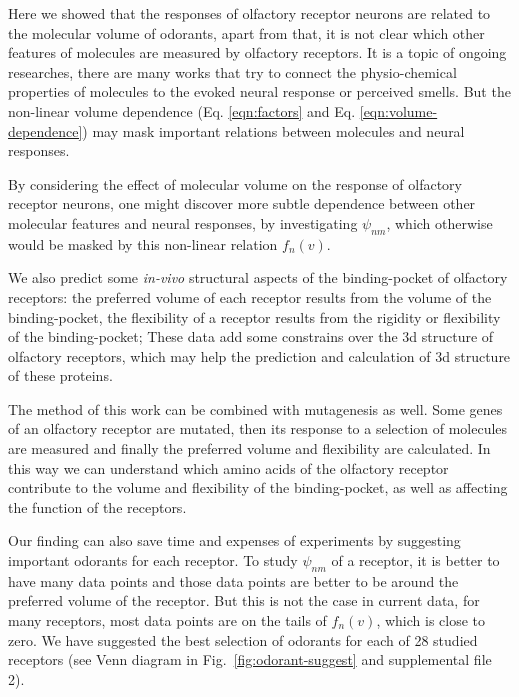 \documentclass[11pt]{paper} %
\newcommand{\numberofreceptors}{ 28 }
\begin{document}
Here we showed that the responses of olfactory receptor neurons are related to the molecular volume of odorants, 
apart from that, it is not clear which other features of molecules are measured by olfactory receptors. 
It is a topic of ongoing researches, 
there are many works that try to connect the physio-chemical properties of molecules to the evoked neural response or perceived smells.
But the non-linear volume dependence (Eq. \ref{eqn:factors} and Eq. \ref{eqn:volume-dependence})  
may mask important relations between molecules and neural responses.

By considering the effect of molecular volume on the response of olfactory receptor neurons, 
one might discover more subtle dependence between other molecular features and neural responses, 
by investigating $\psi_{nm}$, 
which otherwise would be masked by this non-linear relation $f_n(v)$.

We also predict some {\it in-vivo} structural aspects of  the binding-pocket of olfactory receptors:
the preferred volume of each receptor results from the volume of the binding-pocket,
the flexibility of a receptor results from the rigidity or flexibility of the binding-pocket; 
These data add some constrains over the 3d structure of olfactory receptors, 
which may help the prediction and calculation of 3d structure of these proteins. 

The method of this work can be combined with mutagenesis as well. 
Some genes of an olfactory receptor are mutated, 
then its response to a selection of molecules are measured and finally the preferred volume and flexibility are calculated.
In this way we can understand which amino acids of the olfactory receptor contribute to the volume and flexibility of the binding-pocket, 
as well as affecting the function of the receptors.

Our finding can also save time and expenses of experiments by suggesting important odorants for each receptor.
To study $\psi_{nm}$ of a receptor, 
it is better to have many data points and those data points are better to be around the preferred volume of the receptor.
But this is not the case in current data, 
for many receptors, 
most data points are on the tails of $f_n(v)$, which is close to zero.
We have suggested the best selection of odorants for each of \numberofreceptors studied receptors 
(see Venn diagram in Fig.~\ref{fig:odorant-suggest} and supplemental file 2).
\end{document}
